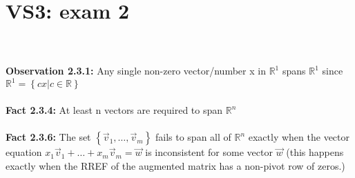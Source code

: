 \documentclass{article}
\begin{document}
{\section{VS3: exam 2}\\
\\
\textbf{Observation 2.3.1:} Any single non-zero vector/number x in $\mathbb{R}^{1}$ spans $\mathbb{R}^{1}$ since $\mathbb{R}^{1} = \left\{ cx \big| c\in \mathbb{R} \right\}$\\
\\
\textbf{Fact 2.3.4:} At least n vectors are required to span $\mathbb{R}^{n}$\\
\\
\textbf{Fact 2.3.6:} The set $\left\{\vec{v}_{1}, \dots, \vec{v}_{m}\right\}$ fails to span all of $\mathbb{R}^{n}$ exactly when the vector equation $x_{1}\vec{v}_{1} + \dots + x_{m}\vec{v}_{m} = \vec{w}$ is inconsistent for some vector $\vec{w}$ (this happens exactly when the RREF of the augmented matrix has a non-pivot row of zeros.) \\
\\
}
\end{document}
